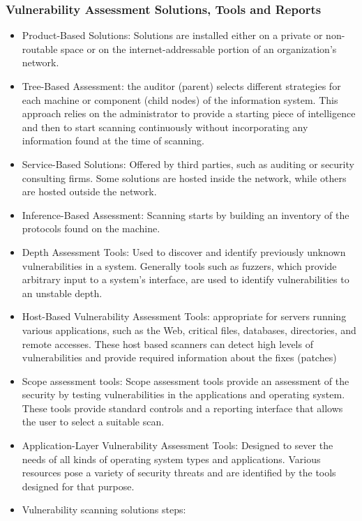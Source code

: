 \subsubsection{Vulnerability Assessment Solutions, Tools and Reports}
\begin{itemize}
    \item Product-Based Solutions: Solutions are installed either on a private or non-routable space or on the internet-addressable portion of an organization's network.
    \item Tree-Based Assessment: the auditor (parent) selects different strategies for each machine or component (child nodes) of the information system. This approach relies on the administrator to provide a starting piece of intelligence and then to start scanning continuously without incorporating any information found at the time of scanning.
    \item Service-Based Solutions: Offered by third parties, such as auditing or security consulting firms. Some solutions are hosted inside the network, while others are hosted outside the network.
    \item Inference-Based Assessment: Scanning starts by building an inventory of the protocols found on the machine.
    \item Depth Assessment Tools: Used to discover and identify previously unknown vulnerabilities in a system. Generally tools such as fuzzers, which provide arbitrary input to a system's interface, are used to identify vulnerabilities to an unstable depth.
    \item Host-Based Vulnerability Assessment Tools: appropriate for servers running various applications, such as the Web, critical files, databases, directories, and remote accesses. These host based scanners can detect high levels of vulnerabilities and provide required information about the fixes (patches)
    \item Scope assessment tools: Scope assessment tools provide an assessment of the security by testing vulnerabilities in the applications and operating system. These tools provide standard controls and a reporting interface that allows the user to select a suitable scan.
    \item Application-Layer Vulnerability Assessment Tools: Designed to sever the needs of all kinds of operating system types and applications. Various resources pose a variety of security threats and are identified by the tools designed for that purpose.
    \item Vulnerability scanning solutions steps:

\end{itemize}
